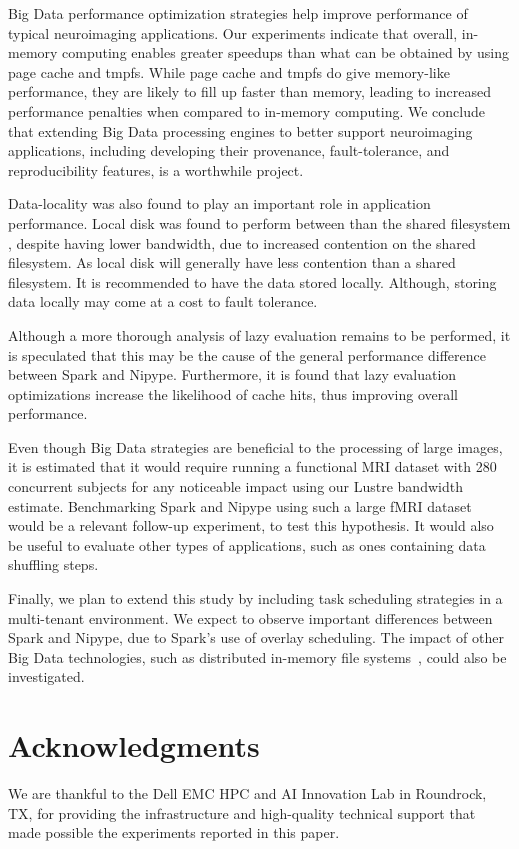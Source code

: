 \documentclass{IEEEtran}
\newcommand{\todo}[1]{\marginpar{\parbox{18mm}{\flushleft\tiny\color{red}\textbf{TODO}:
      #1}}}
\begin{document}
Big Data performance optimization strategies help improve performance of typical 
neuroimaging applications. Our experiments indicate that overall, in-memory computing 
enables greater speedups than what can be obtained by using page cache 
and tmpfs. While page cache and tmpfs do give memory-like performance, 
they are likely to fill up faster than memory, leading to increased 
performance penalties when compared to in-memory computing. We conclude 
that extending Big Data processing engines to better support 
neuroimaging applications, including developing their provenance, 
fault-tolerance, and reproducibility features, is a worthwhile project.

Data-locality was also found to play an important role in application 
performance. Local disk was found to perform between than the shared 
filesystem \todo{between than the shared filesystem: what does it 
mean?}, despite having lower bandwidth, due to increased contention on 
the shared filesystem. As local disk will generally have less 
contention than a shared filesystem. It is recommended to have the data 
stored locally. Although, storing data locally may come at a cost to 
fault tolerance.

Although a more thorough analysis of lazy evaluation remains to be 
performed, it is speculated that this may be the cause of the general 
performance difference between Spark and Nipype. Furthermore, it is 
found that lazy evaluation optimizations increase the likelihood of 
cache hits, thus improving overall performance.

Even though Big Data strategies are beneficial to the processing of 
large images, it is estimated that it would require running a 
functional MRI dataset with 280 concurrent subjects for any noticeable 
impact using our Lustre bandwidth estimate. Benchmarking Spark and 
Nipype using such a large fMRI dataset would be a relevant follow-up 
experiment, to test this hypothesis. It would also be useful to evaluate
other types of applications, such as ones containing data shuffling steps.

Finally, we plan to extend this study by including task scheduling 
strategies in a multi-tenant environment. We expect to observe 
important differences between Spark and Nipype, due to Spark's use of 
overlay scheduling. The impact of other Big Data technologies, such as 
distributed in-memory file systems~\cite{ignite}, could also be 
investigated.

\section{Acknowledgments}

We are thankful to the Dell EMC HPC and AI Innovation Lab
in Roundrock, TX, for providing the infrastructure and high-quality
technical support that made possible the experiments reported in this paper.

 

\end{document}
